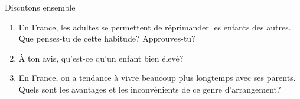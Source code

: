 \begin{frame}{Discutons ensemble}
  \begin{enumerate}
    \item En France, les adultes se permettent de réprimander les enfants des autres. Que penses-tu de cette habitude? Approuves-tu?
    \item<2-> À ton avis, qu'est-ce qu'un enfant bien élevé?
    \item<3-> En France, on a tendance à vivre beaucoup plus longtemps avec ses parents. Quels sont les avantages et les inconvénients de ce genre d'arrangement?
  \end{enumerate}
\end{frame}